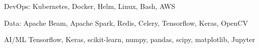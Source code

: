 
\begin{cvskills}

\cvskill
    {DevOps:} %
    {Kubernetes, Docker, Helm, Linux, Bash, AWS} %

\cvskill
    {Data:} %
    {Apache Beam, Apache Spark, Redis, Celery, Tensorflow, Keras, OpenCV} %

\cvskill
    {AI/ML} %
    {Tensorflow, Keras, scikit-learn, numpy, pandas, scipy, matplotlib, Jupyter} %



\end{cvskills}